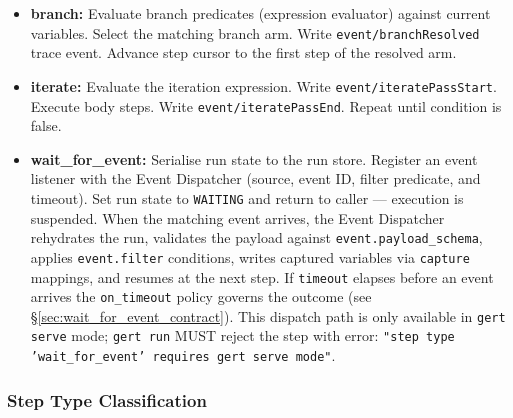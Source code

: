 \begin{itemize}
        current execution queue at \texttt{Depth+1}. The include step itself does not
        appear in the run trace; expanded steps run as if defined inline, each carrying
        an \texttt{Origin} breadcrumb: \texttt{[included from: <path>]}. Includes may be
        materialized eagerly (loaded and expanded at plan time) or lazily (loaded,
        planned, and inlined when the step is actually entered) according to the
        runbook's \texttt{expand} field, the site's \texttt{include.expand}, or the
        runtime default; see \S\ref{para:include-expand}. Lazy includes carry only
        an absolute path through the plan; at execution time the include executor
        delegates to a sub-engine that reuses the parent run identifier so deferred
        prompts surface on the parent's interaction stream.
  \item \textbf{branch:} Evaluate branch predicates (expression evaluator) against current
        variables. Select the matching branch arm. Write \texttt{event/branchResolved}
        trace event. Advance step cursor to the first step of the resolved arm.
  \item \textbf{iterate:} Evaluate the iteration expression. Write
        \texttt{event/iteratePassStart}. Execute body steps. Write
        \texttt{event/iteratePassEnd}. Repeat until condition is false.
  \item \textbf{wait\_for\_event:} Serialise run state to the run store. Register an event
        listener with the Event Dispatcher (source, event ID, filter predicate, and timeout).
        Set run state to \texttt{WAITING} and return to caller — execution is suspended.
        When the matching event arrives, the Event Dispatcher rehydrates the run, validates
        the payload against \texttt{event.payload\_schema}, applies \texttt{event.filter}
        conditions, writes captured variables via \texttt{capture} mappings, and resumes
        at the next step. If \texttt{timeout} elapses before an event arrives the
        \texttt{on\_timeout} policy governs the outcome (see
        §\ref{sec:wait_for_event_contract}). This dispatch path is only available in
        \texttt{gert serve} mode; \texttt{gert run} MUST reject the step with error:
        \texttt{"step type 'wait\_for\_event' requires gert serve mode"}.
\end{itemize}

\subsubsection*{Step Type Classification}

